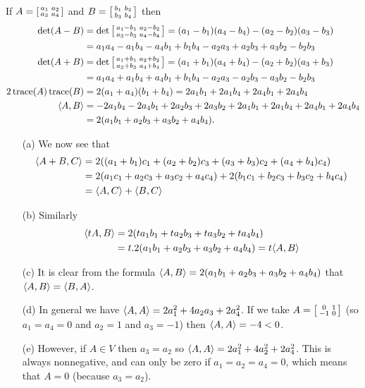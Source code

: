  If $A=\left[\begin{smallmatrix} a_1&a_2\\a_3&a_4\end{smallmatrix}\right]$ and
 $B=\left[\begin{smallmatrix} b_1&b_2\\ b_3&b_4\end{smallmatrix}\right]$ then
 \begin{align*}
  \det(A-B)
    &= \det\left[\begin{smallmatrix} a_1-b_1&a_2-b_2\\a_3-b_3&a_4-b_4\end{smallmatrix}\right]
     = (a_1-b_1)(a_4-b_4)-(a_2-b_2)(a_3-b_3) \\
    &= a_1a_4-a_1b_4-a_4b_1+b_1b_4
       -a_2a_3+a_2b_3+a_3b_2-b_2b_3 \\
  \det(A+B)
    &= \det\left[\begin{smallmatrix} a_1+b_1&a_2+b_2\\a_3+b_3&a_4+b_4\end{smallmatrix}\right]
     = (a_1+b_1)(a_4+b_4)-(a_2+b_2)(a_3+b_3) \\
    &= a_1a_4+a_1b_4+a_4b_1+b_1b_4
       -a_2a_3-a_2b_3-a_3b_2-b_2b_3 \\
  2\operatorname{trace}(A)\operatorname{trace}(B)
    &= 2(a_1+a_4)(b_1+b_4)
     = 2a_1b_1 + 2a_1b_4 + 2a_4b_1 + 2 a_4b_4 \\
  \langle A,B\rangle
    &= -2a_1b_4 -2a_4b_1 + 2a_2b_3 + 2a_3b_2 +
       2a_1b_1 + 2a_1b_4 + 2a_4b_1 + 2 a_4b_4 \\
    &= 2(a_1b_1+a_2b_3+a_3b_2+a_4b_4).
 \end{align*}
 \begin{itemize}
  \item[(a)] We now see that
   \begin{align*}
    \langle A+B,C\rangle
     &= 2((a_1+b_1)c_1+(a_2+b_2)c_3+(a_3+b_3)c_2+(a_4+b_4)c_4)\\
     &= 2(a_1c_1+a_2c_3+a_3c_2+a_4c_4) +
        2(b_1c_1+b_2c_3+b_3c_2+b_4c_4) \\
     &= \langle A,C\rangle + \langle B,C\rangle
   \end{align*}
  \item[(b)] Similarly
   \begin{align*}
    \langle tA,B\rangle
     &= 2(ta_1b_1+ta_2b_3+ta_3b_2+ta_4b_4) \\
     &= t.2(a_1b_1+a_2b_3+a_3b_2+a_4b_4) = t\langle A,B\rangle
   \end{align*}
  \item[(c)] It is clear from the formula
   $\langle A,B\rangle=2(a_1b_1+a_2b_3+a_3b_2+a_4b_4)$ that
   $\langle A,B\rangle=\langle B,A\rangle$.
  \item[(d)] In general we have
   $\langle A,A\rangle=2a_1^2+4a_2a_3+2a_4^2$.  If we take
   $A=\left[\begin{smallmatrix} 0&1\\-1&0\end{smallmatrix}\right]$ (so $a_1=a_4=0$ and $a_2=1$ and
   $a_3=-1$) then $\langle A,A\rangle=-4<0$.
  \item[(e)] However, if $A\in V$ then $a_3=a_2$ so
   $\langle A,A\rangle=2a_1^2+4a_2^2+2a_4^2$.  This is always
   nonnegative, and can only be zero if $a_1=a_2=a_4=0$,
   which means that $A=0$ (because $a_3=a_2$).
 \end{itemize}
\EndDeferredSolution

